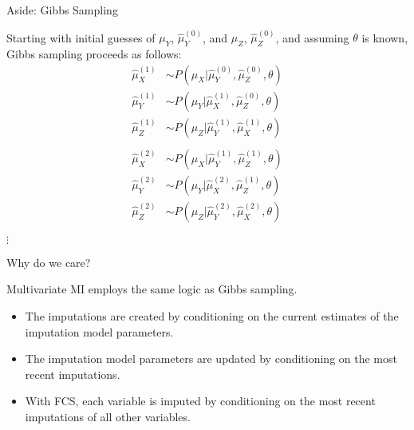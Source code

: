 \documentclass{beamer}\usepackage[]{graphicx}\usepackage[]{color}
\begin{document}
\begin{frame}{Aside: Gibbs Sampling}
  
  Starting with initial guesses of $\mu_Y$, $\hat{\mu}_Y^{(0)}$, and
  $\mu_Z$, $\hat{\mu}_Z^{(0)}$, and assuming $\theta$ is known, Gibbs
  sampling proceeds as follows:
  \begin{align*}
    \hat{\mu}_X^{(1)} &\sim P(\mu_X | \hat{\mu}_Y^{(0)}, \hat{\mu}_Z^{(0)}, \theta)\\
    \hat{\mu}_Y^{(1)} &\sim P(\mu_Y | \hat{\mu}_X^{(1)}, \hat{\mu}_Z^{(0)}, \theta)\\
    \hat{\mu}_Z^{(1)} &\sim P(\mu_Z | \hat{\mu}_Y^{(1)}, \hat{\mu}_X^{(1)}, \theta)\\
    \\
    \hat{\mu}_X^{(2)} &\sim P(\mu_X | \hat{\mu}_Y^{(1)}, \hat{\mu}_Z^{(1)}, \theta)\\
    \hat{\mu}_Y^{(2)} &\sim P(\mu_Y | \hat{\mu}_X^{(2)}, \hat{\mu}_Z^{(1)}, \theta)\\
    \hat{\mu}_Z^{(2)} &\sim P(\mu_Z | \hat{\mu}_Y^{(2)}, \hat{\mu}_X^{(2)}, \theta)
  \end{align*}
  \vspace{-40pt}
  \begin{center}\huge{$\vdots$}\end{center}
  
\end{frame}


\begin{frame}{Why do we care?}
  
  Multivariate MI employs the same logic as Gibbs sampling.
  \vb
  \begin{itemize}
  \item The imputations are created by conditioning on the current estimates of 
    the imputation model parameters.
    \vb
  \item The imputation model parameters are updated by conditioning on the most 
    recent imputations.
    \vb
  \item With FCS, each variable is imputed by conditioning on the most recent 
    imputations of all other variables.
  \end{itemize}
  
\end{frame}

\end{document}
